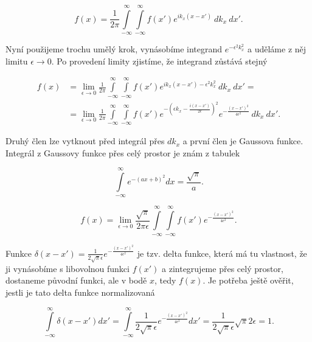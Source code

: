 \begin{equation}
f(x) = \frac{1}{2 \pi} \int\limits_{-\infty}^{\infty} \int\limits_{-\infty}^{\infty} f(x') e^{ik_x(x-x')} ~ dk_x ~ dx'.
\end{equation}

Nyní použijeme trochu umělý krok, vynásobíme integrand $e^{-\epsilon^2 k_x^2}$ a uděláme z něj limitu $\epsilon \rightarrow 0$. Po provedení limity zjistíme, že integrand zůstává stejný

\begin{equation}
\begin{aligned}
f(x) & = \lim_{\epsilon \to 0} \frac{1}{2 \pi} \int\limits_{-\infty}^{\infty} \int\limits_{-\infty}^{\infty} f(x') e^{ik_x(x-x') -\epsilon^2 k_x^2} ~ dk_x ~ dx' =\\
& = \lim_{\epsilon \to 0} \frac{1}{2 \pi} \int\limits_{-\infty}^{\infty} \int\limits_{-\infty}^{\infty} f(x') e^{-\left(\epsilon k_x - \frac{i (x-x')}{2 \epsilon}\right)^2} e^{- \frac{(x-x')^2}{4\epsilon^2}} ~ dk_x ~ dx'.
\end{aligned}
\end{equation}

Druhý člen lze vytknout před integrál přes $dk_x$ a první člen je Gaussova funkce. Integrál z Gaussovy funkce přes celý prostor je znám z tabulek

\begin{equation}
\int\limits_{-\infty}^{\infty} e^{-(ax+b)^2} dx = \frac{\sqrt{\pi}}{a}.
\end{equation}

\begin{equation}\label{eq:fourier_delta}
f(x) = \lim_{\epsilon \to 0} \frac{\sqrt{\pi}}{2 \pi \epsilon} \int\limits_{-\infty}^{\infty} \int\limits_{-\infty}^{\infty} f(x') e^{-\frac{(x-x')^2}{4\epsilon^2}}.
\end{equation}

Funkce $\delta(x-x') = \frac{1}{2 \sqrt{\pi} \epsilon} e^{-\frac{(x-x')^2}{4\epsilon^2}}$ je tzv. delta funkce, která má tu vlastnost, že ji vynásobíme s libovolnou funkci $f(x')$ a zintegrujeme přes celý prostor, dostaneme původní funkci, ale v bodě $x$, tedy $f(x)$. Je potřeba ještě ověřit, jestli je tato delta funkce normalizovaná

\begin{equation}
\int\limits_{-\infty}^{\infty}\delta(x-x') dx' = \int\limits_{-\infty}^{\infty} \frac{1}{2 \sqrt{\pi} \epsilon} e^{-\frac{(x-x')^2}{4\epsilon^2}} dx' = \frac{1}{2 \sqrt{\pi} \epsilon} \sqrt{\pi} 2 \epsilon = 1.
\end{equation}

